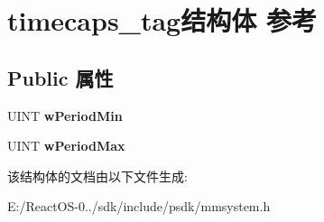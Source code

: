 \hypertarget{structtimecaps__tag}{}\section{timecaps\+\_\+tag结构体 参考}
\label{structtimecaps__tag}
\subsection*{Public 属性}
\begin{DoxyCompactItemize}
\item 
\mbox{\label{structtimecaps__tag_a230c10008425ef1faa5ecc6b78dabe56}} 
U\+I\+NT {\bfseries w\+Period\+Min}
\item 
\mbox{\label{structtimecaps__tag_af5562bc4bec49ad3de12814cda679a40}} 
U\+I\+NT {\bfseries w\+Period\+Max}
\end{DoxyCompactItemize}


该结构体的文档由以下文件生成\+:\begin{DoxyCompactItemize}
\item 
E\+:/\+React\+O\+S-\/0../sdk/include/psdk/mmsystem.\+h\end{DoxyCompactItemize}
